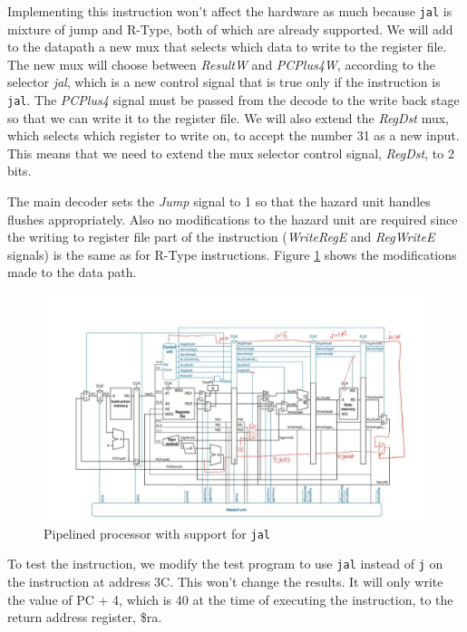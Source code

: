 \documentclass[titlepage,12pt,oneside,a4paper]{article}
\newcommand{\code}[1]{{\texttt{#1}}}
\begin{document}
Implementing this instruction won't affect the hardware as much because \code{jal} is mixture of jump and R-Type, both of which are already supported. We will add to the datapath a new mux that selects which data to write to the register file. The new mux will choose between \textit{ResultW} and \textit{PCPlus4W}, according to the selector \textit{jal}, which is a new control signal that is true only if the instruction is \code{jal}. The \textit{PCPlus4} signal must be passed from the decode to the write back stage so that we can write it to the register file. We will also extend the \textit{RegDst} mux, which selects which register to write on, to accept the number 31 as a new input. This means that we need to extend the mux selector control signal, \textit{RegDst}, to 2 bits.

The main decoder sets the \textit{Jump} signal to 1 so that the hazard unit handles flushes appropriately. Also no modifications to the hazard unit are required since the writing to register file part of the instruction (\textit{WriteRegE} and \textit{RegWriteE} signals) is the same as for R-Type instructions. Figure \ref{fig:jal} shows the modifications made to the data path.

\begin{figure}
	\includegraphics[width=\textwidth]{jal.jpeg}
	\centering
	\caption{Pipelined processor with support for \code{jal}}
	\label{fig:jal}
\end{figure}

To test the instruction, we modify the test program to use \code{jal} instead of \code{j} on the instruction at address 3C. This won't change the results. It will only write the value of PC + 4, which is 40 at the time of executing the instruction, to the return address register, \$ra.
\end{document}
